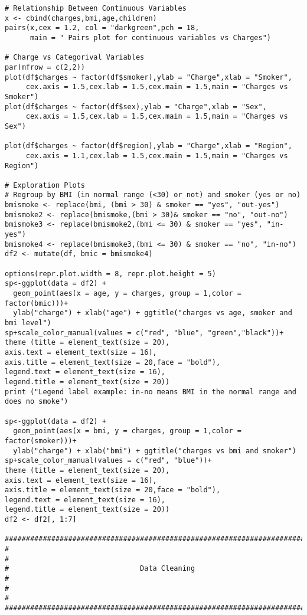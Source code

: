 \documentclass[12pt]{article}
\begin{document}
\begin{verbatim}
# Relationship Between Continuous Variables
x <- cbind(charges,bmi,age,children) 
pairs(x,cex = 1.2, col = "darkgreen",pch = 18, 
      main = " Pairs plot for continuous variables vs Charges")

# Charge vs Categorival Variables
par(mfrow = c(2,2))
plot(df$charges ~ factor(df$smoker),ylab = "Charge",xlab = "Smoker",
     cex.axis = 1.5,cex.lab = 1.5,cex.main = 1.5,main = "Charges vs Smoker")
plot(df$charges ~ factor(df$sex),ylab = "Charge",xlab = "Sex",
     cex.axis = 1.5,cex.lab = 1.5,cex.main = 1.5,main = "Charges vs Sex")

plot(df$charges ~ factor(df$region),ylab = "Charge",xlab = "Region",
     cex.axis = 1.1,cex.lab = 1.5,cex.main = 1.5,main = "Charges vs Region")

# Exploration Plots
# Regroup by BMI (in normal range (<30) or not) and smoker (yes or no)
bmismoke <- replace(bmi, (bmi > 30) & smoker == "yes", "out-yes")
bmismoke2 <- replace(bmismoke,(bmi > 30)& smoker == "no", "out-no")
bmismoke3 <- replace(bmismoke2,(bmi <= 30) & smoker == "yes", "in-yes")
bmismoke4 <- replace(bmismoke3,(bmi <= 30) & smoker == "no", "in-no")
df2 <- mutate(df, bmic = bmismoke4)

options(repr.plot.width = 8, repr.plot.height = 5)
sp<-ggplot(data = df2) +
  geom_point(aes(x = age, y = charges, group = 1,color = factor(bmic)))+
  ylab("charge") + xlab("age") + ggtitle("charges vs age, smoker and bmi level")
sp+scale_color_manual(values = c("red", "blue", "green","black"))+
theme (title = element_text(size = 20), 
axis.text = element_text(size = 16), 
axis.title = element_text(size = 20,face = "bold"),
legend.text = element_text(size = 16),
legend.title = element_text(size = 20))
print ("Legend label example: in-no means BMI in the normal range and does no smoke")

sp<-ggplot(data = df2) +
  geom_point(aes(x = bmi, y = charges, group = 1,color = factor(smoker)))+
  ylab("charge") + xlab("bmi") + ggtitle("charges vs bmi and smoker")
sp+scale_color_manual(values = c("red", "blue"))+
theme (title = element_text(size = 20), 
axis.text = element_text(size = 16), 
axis.title = element_text(size = 20,face = "bold"),
legend.text = element_text(size = 16),
legend.title = element_text(size = 20)) 
df2 <- df2[, 1:7]

#######################################################################
#                                                                     #
#                               Data Cleaning                         #
#                                                                     #
#######################################################################


\end{verbatim}
\end{document}
